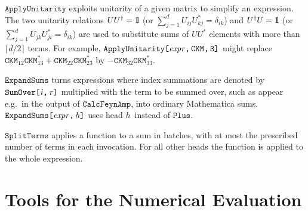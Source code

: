 \documentclass[twoside,11pt]{article}
\def\Var#1{\ensuremath{\mathit{#1}}}
\def\Vh{\Var{h}}
\def\Vi{\Var{i}}
\def\Vr{\Var{r}}
\def\Code#1{\ensuremath{\texttt{#1}}}
\def\unity{{\rm 1\mskip-4.25mu l}}
\def\eg{e.g.\ }
\begin{document}
\Code{ApplyUnitarity} exploits unitarity of a given matrix to simplify 
an expression.  The two unitarity relations $UU^\dagger = \unity$ (or
$\sum_{j = 1}^d U_{ij} U_{kj}^* = \delta_{ik}$) and $U^\dagger U =
\unity$ (or $\sum_{j = 1}^d U_{jk} U_{ji}^* = \delta_{ik}$) are used to
substitute sums of $UU^*$ elements with more than $\lceil d/2\rceil$
terms.  For example, \Code{ApplyUnitarity[\Var{expr},\,CKM,\,3]} might 
replace $\Code{CKM}_{12} \Code{CKM}_{13}^* + \Code{CKM}_{22} 
\Code{CKM}_{23}^*$ by $-\Code{CKM}_{32}\Code{CKM}_{33}^*$.

\Code{ExpandSums} turns expressions where index summations are denoted 
by \Code{SumOver[\Vi,\,\Vr]} multiplied with the term to be summed over,
such as appear \eg in the output of \Code{CalcFeynAmp}, into ordinary 
Mathematica sums.  \Code{ExpandSums[\Var{expr},\,\Vh]} uses head \Vh\ 
instead of \Code{Plus}.

\Code{SplitTerms} applies a function to a sum in batches, with at most 
the prescribed number of terms in each invocation.  For all other heads 
the function is applied to the whole expression.


\section{Tools for the Numerical Evaluation}
%
\end{document}
